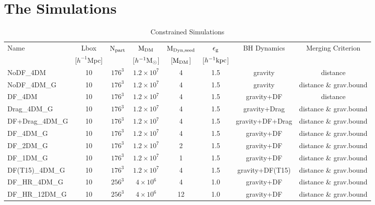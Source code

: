 \section{The Simulations}
\label{sec:simulations}





\begin{table*}
\caption{Constrained Simulations}
\label{tab:cons}
\begin{tabular}{lccccccc}
\hline
Name & Lbox & ${\rm N}_{\rm part}$ & ${\rm M}_{\rm DM}$ & ${\rm M}_{\rm Dyn,seed}$ & $\epsilon_{\rm g}$ & BH Dynamics & Merging Criterion \\
& [$h^{-1}$Mpc] & & [$h^{-1} {\rm M}_\odot$] & [${\rm M}_{\rm DM}$] & [$h^{-1}{\rm kpc}$] & &  \\
\hline
NoDF\_4DM & 10 & $176^3$ & $1.2\times 10^7$ & 4 & 1.5 & gravity & distance\\
NoDF\_4DM\_G & 10 & $176^3$ & $1.2\times 10^7$ & 4 & 1.5 & gravity & distance \& grav.bound\\
DF\_4DM & 10 & $176^3$ & $1.2\times 10^7$ & 4 & 1.5 & gravity+DF & distance\\
Drag\_4DM\_G & 10 & $176^3$ & $1.2\times 10^7$ & 4 & 1.5 & gravity+Drag & distance \& grav.bound\\
DF+Drag\_4DM\_G & 10 & $176^3$ & $1.2\times 10^7$ & 4 & 1.5 & gravity+DF+Drag & distance \& grav.bound\\
DF\_4DM\_G & 10 & $176^3$ & $1.2\times 10^7$ & 4 & 1.5 & gravity+DF & distance \& grav.bound\\
DF\_2DM\_G & 10 & $176^3$ & $1.2\times 10^7$ & 2 & 1.5 & gravity+DF & distance \& grav.bound\\
DF\_1DM\_G & 10 & $176^3$ & $1.2\times 10^7$ & 1 & 1.5 & gravity+DF & distance \& grav.bound\\
DF(T15)\_4DM\_G & 10 & $176^3$ & $1.2\times 10^7$ & 4 & 1.5 & gravity+DF(T15) & distance \& grav.bound\\
DF\_HR\_4DM\_G & 10 & $256^3$ & $4\times 10^6$ & 4 & 1.0 & gravity+DF & distance \& grav.bound\\
DF\_HR\_12DM\_G & 10 & $256^3$ & $4\times 10^6$ & 12 & 1.0 & gravity+DF & distance \& grav.bound\\
\hline
\end{tabular}
\end{table*}

